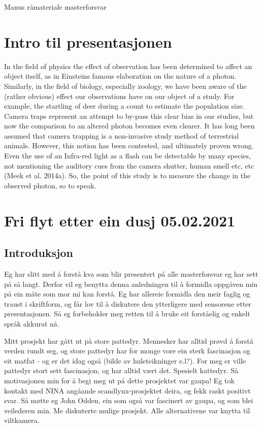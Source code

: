 Manus råmateriale  masterforsvar


\section{Intro til presentasjonen} 

In the field of physics the effect of observation has been determined to affect an object itself, as in Einsteins famous elaboration on the nature of a photon. Similarly, in the field of biology, especially zoology, we have been aware of the (rather obvious) effect our observations have on our object of a study. For example, the startling of deer during a count to estimate the population size. Camera traps represent an attempt to by-pass this clear bias in our studies, but now the comparison to an altered photon becomes even clearer. It has long been assumed that camera trapping is a non-invasive study method of terrestrial animals. However, this notion has been contested, and ultimately proven wrong. Even the use of an Infra-red light as a flash can be detectable by many species, not mentioning the auditory cues from the camera shutter, human smell etc, etc (Meek et al. 2014a).
So, the point of this study is to measure the change in the observed photon, so to speak.





\section{Fri flyt etter ein dusj 05.02.2021} 

\subsection{Introduksjon} 

Eg har slitt med å forstå kva som blir presentert på alle masterforsvar eg har sett på så langt. Derfor vil eg benytta denna anledningen til å formidla oppgåven min på ein måte som mor mi kan forstå. Eg har allereie formidla den meir faglig og traust i skriftform, og får lov til å diskutere den ytterligere med sensorene etter presentasjonen. Så eg forbeholder meg retten til å bruke eit forståelig og enkelt språk akkurat nå.

Mitt prosjekt har gått ut på store pattedyr. Mennesker har alltid prøvd å forstå verden rundt seg, og store pattedyr har for monge vore ein sterk fascinasjon og eit matfat -  og er det idag også (bilde av huleteikninger e.l?).
For meg er ville pattedyr stort sett fascinasjon, og har alltid vært det. Spesielt kattedyr. Så motivasjonen min for å begi meg ut på dette prosjektet var gaupa!
Eg tok kontakt med NINA angåande scandlynx-prosjektet deira, og fekk raskt positivt svar. Så møtte eg John Odden, ein som også var fascinert av gaupa, og som blei veilederen min. Me diskuterte mulige prosjekt. Alle alternativene var knytta til viltkamera.

